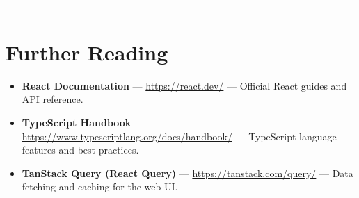 ---

\section{Further Reading}
\label{sec:ch21-further}

\begin{itemize}
  \item \textbf{React Documentation} --- \url{https://react.dev/} --- Official React guides and API reference.
  \item \textbf{TypeScript Handbook} --- \url{https://www.typescriptlang.org/docs/handbook/} --- TypeScript language features and best practices.
  \item \textbf{TanStack Query (React Query)} --- \url{https://tanstack.com/query/} --- Data fetching and caching for the web UI.
\end{itemize}